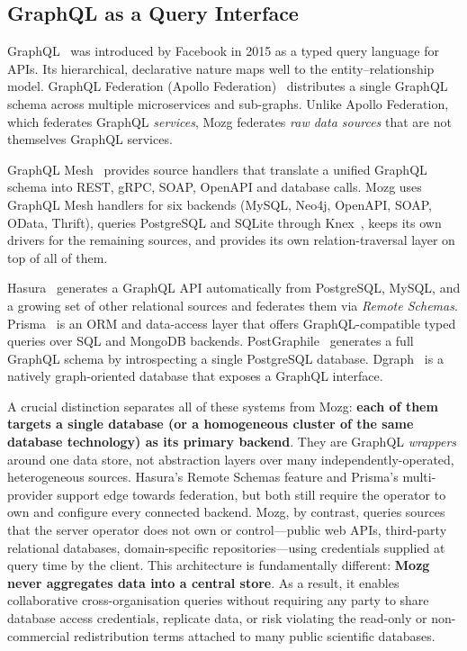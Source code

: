 \documentclass[sigconf,nonacm]{acmart}
\begin{document}
\subsection{GraphQL as a Query Interface}

GraphQL~\cite{graphql2015} was introduced by Facebook in 2015 as a
typed query language for APIs.  Its hierarchical, declarative nature
maps well to the entity--relationship model.  GraphQL Federation
(Apollo Federation)~\cite{apollofederation} distributes a single
GraphQL schema across multiple microservices and sub-graphs.  Unlike
Apollo Federation, which federates GraphQL \emph{services},
Mozg federates \emph{raw data sources} that are not themselves GraphQL
services.

GraphQL Mesh~\cite{graphqlmesh} provides source handlers that translate
a unified GraphQL schema into REST, gRPC, SOAP, OpenAPI and database
calls.  Mozg uses GraphQL Mesh handlers for six backends (MySQL, Neo4j,
OpenAPI, SOAP, OData, Thrift), queries PostgreSQL and SQLite through
Knex~\cite{knex}, keeps its own drivers for the remaining sources, and
provides its own relation-traversal layer on top of all of them.

Hasura~\cite{hasura} generates a GraphQL API automatically from
PostgreSQL, MySQL, and a growing set of other relational sources and
federates them via \emph{Remote Schemas}.  Prisma~\cite{prisma} is an
ORM and data-access layer that offers GraphQL-compatible typed queries
over SQL and MongoDB backends.  PostGraphile~\cite{postgraphile} generates
a full GraphQL schema by introspecting a single PostgreSQL database.
Dgraph~\cite{dgraph} is a natively graph-oriented database that exposes
a GraphQL interface.

A crucial distinction separates all of these systems from Mozg:
\textbf{each of them targets a single database (or a homogeneous cluster
of the same database technology) as its primary backend}.  They are
GraphQL \emph{wrappers} around one data store, not abstraction layers
over many independently-operated, heterogeneous sources.  Hasura's
Remote Schemas feature and Prisma's multi-provider support edge towards
federation, but both still require the operator to own and configure
every connected backend.  Mozg, by contrast, queries sources that the
server operator does not own or control---public web APIs, third-party
relational databases, domain-specific repositories---using credentials
supplied at query time by the client.  This architecture is
fundamentally different: \textbf{Mozg never aggregates data into a
central store}.  As a result, it enables collaborative
cross-organisation queries without requiring any party to share
database access credentials, replicate data, or risk violating the
read-only or non-commercial redistribution terms attached to many
public scientific databases.
\end{document}
